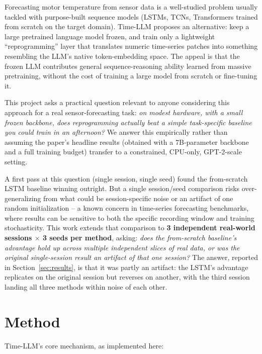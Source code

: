\documentclass[11pt]{article}
\begin{document}
Forecasting motor temperature from sensor data is a well-studied problem
usually tackled with purpose-built sequence models (LSTMs, TCNs, Transformers
trained from scratch on the target domain). Time-LLM \citep{jin2023time}
proposes an alternative: keep a large pretrained language model frozen, and
train only a lightweight ``reprogramming'' layer that translates numeric
time-series patches into something resembling the LLM's native
token-embedding space. The appeal is that the frozen LLM contributes general
sequence-reasoning ability learned from massive pretraining, without the cost
of training a large model from scratch or fine-tuning it.

This project asks a practical question relevant to anyone considering this
approach for a real sensor-forecasting task: \textit{on modest hardware, with
a small frozen backbone, does reprogramming actually beat a simple
task-specific baseline you could train in an afternoon?} We answer this
empirically rather than assuming the paper's headline results (obtained with
a 7B-parameter backbone and a full training budget) transfer to a
constrained, CPU-only, GPT-2-scale setting.

A first pass at this question (single session, single seed) found the
from-scratch LSTM baseline winning outright. But a single session/seed
comparison risks over-generalizing from what could be session-specific noise
or an artifact of one random initialization -- a known concern in
time-series forecasting benchmarks, where results can be sensitive to both
the specific recording window and training stochasticity. This work extends
that comparison to \textbf{3 independent real-world sessions \(\times\) 3
seeds per method}, asking: \textit{does the from-scratch baseline's advantage
hold up across multiple independent slices of real data, or was the original
single-session result an artifact of that one session?} The answer, reported
in Section~\ref{sec:results}, is that it was partly an artifact: the LSTM's
advantage replicates on the original session but reverses on another, with
the third session landing all three methods within noise of each other.

\section{Method}

Time-LLM's core mechanism, as implemented here:
\end{document}
